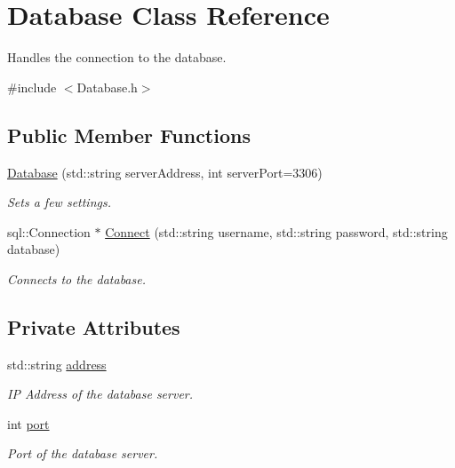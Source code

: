 \hypertarget{classDatabase}{\section{Database Class Reference}
\label{classDatabase}
}


Handles the connection to the database.  




{\ttfamily \#include $<$Database.\-h$>$}

\subsection*{Public Member Functions}
\begin{DoxyCompactItemize}
\item 
\hyperlink{classDatabase_acebb76b52b5efea89c7417d65bb5980e}{Database} (std\-::string server\-Address, int server\-Port=3306)
\begin{DoxyCompactList}\small\item\em Sets a few settings. \end{DoxyCompactList}\item 
sql\-::\-Connection $\ast$ \hyperlink{classDatabase_a22555b63ce54c0b4a0e1b1aecb5e1bd4}{Connect} (std\-::string username, std\-::string password, std\-::string database)
\begin{DoxyCompactList}\small\item\em Connects to the database. \end{DoxyCompactList}\end{DoxyCompactItemize}
\subsection*{Private Attributes}
\begin{DoxyCompactItemize}
\item 
\hypertarget{classDatabase_aaf36450a11d38f6fde645bb8a0d07381}{std\-::string \hyperlink{classDatabase_aaf36450a11d38f6fde645bb8a0d07381}{address}}\label{classDatabase_aaf36450a11d38f6fde645bb8a0d07381}

\begin{DoxyCompactList}\small\item\em I\-P Address of the database server. \end{DoxyCompactList}\item 
\hypertarget{classDatabase_a6557601838cc506cd59638f4c368f5c2}{int \hyperlink{classDatabase_a6557601838cc506cd59638f4c368f5c2}{port}}\label{classDatabase_a6557601838cc506cd59638f4c368f5c2}

\begin{DoxyCompactList}\small\item\em Port of the database server. \end{DoxyCompactList}\end{DoxyCompactItemize}


